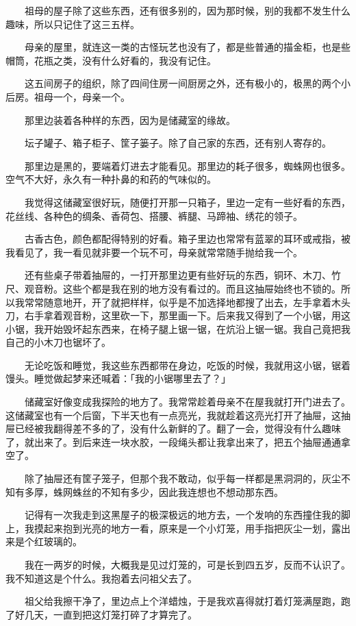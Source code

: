 \documentclass[UTF8]{ctexart}
\begin{document}
　　祖母的屋子除了这些东西，还有很多别的，因为那时候，别的我都不发生什么趣味，所以只记住了这三五样。

　　母亲的屋里，就连这一类的古怪玩艺也没有了，都是些普通的描金柜，也是些帽筒，花瓶之类，没有什么好看的，我没有记住。

　　这五间房子的组织，除了四间住房一间厨房之外，还有极小的，极黑的两个小后房。祖母一个，母亲一个。

　　那里边装着各种样的东西，因为是储藏室的缘故。

　　坛子罐子、箱子柜子、筐子篓子。除了自己家的东西，还有别人寄存的。

　　那里边是黑的，要端着灯进去才能看见。那里边的耗子很多，蜘蛛网也很多。空气不大好，永久有一种扑鼻的和药的气味似的。

　　我觉得这储藏室很好玩，随便打开那一只箱子，里边一定有一些好看的东西，花丝线、各种色的绸条、香荷包、搭腰、裤腿、马蹄袖、绣花的领子。

　　古香古色，颜色都配得特别的好看。箱子里边也常常有蓝翠的耳环或戒指，被我看见了，我一看见就非要一个玩不可，母亲就常常随手抛给我一个。

　　还有些桌子带着抽屉的，一打开那里边更有些好玩的东西，铜环、木刀、竹尺、观音粉。这些个都是我在别的地方没有看过的。而且这抽屉始终也不锁的。所以我常常随意地开，开了就把样样，似乎是不加选择地都搜了出去，左手拿着木头刀，右手拿着观音粉，这里砍一下，那里画一下。后来我又得到了一个小锯，用这小锯，我开始毁坏起东西来，在椅子腿上锯一锯，在炕沿上锯一锯。我自己竟把我自己的小木刀也锯坏了。

　　无论吃饭和睡觉，我这些东西都带在身边，吃饭的时候，我就用这小锯，锯着馒头。睡觉做起梦来还喊着：「我的小锯哪里去了？」

　　储藏室好像变成我探险的地方了。我常常趁着母亲不在屋我就打开门进去了。这储藏室也有一个后窗，下半天也有一点亮光，我就趁着这亮光打开了抽屉，这抽屉已经被我翻得差不多的了，没有什么新鲜的了。翻了一会，觉得没有什么趣味了，就出来了。到后来连一块水胶，一段绳头都让我拿出来了，把五个抽屉通通拿空了。

　　除了抽屉还有筐子笼子，但那个我不敢动，似乎每一样都是黑洞洞的，灰尘不知有多厚，蛛网蛛丝的不知有多少，因此我连想也不想动那东西。

　　记得有一次我走到这黑屋子的极深极远的地方去，一个发响的东西撞住我的脚上，我摸起来抱到光亮的地方一看，原来是一个小灯笼，用手指把灰尘一划，露出来是个红玻璃的。

　　我在一两岁的时候，大概我是见过灯笼的，可是长到四五岁，反而不认识了。我不知道这是个什么。我抱着去问祖父去了。

　　祖父给我擦干净了，里边点上个洋蜡烛，于是我欢喜得就打着灯笼满屋跑，跑了好几天，一直到把这灯笼打碎了才算完了。
\end{document}
